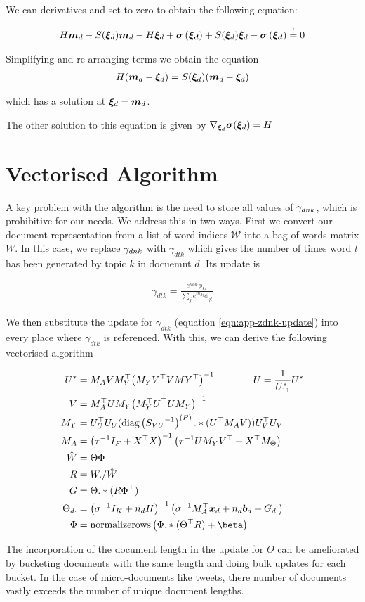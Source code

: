 We can derivatives and set to zero to obtain the following equation:

\begin{align}
  H\bm m_d
- S({ \bm \xi_d })\bm m_d
- H { \bm \xi_d } 
+ \bm \sigma\left(\bm {{ \bm \xi_d }}\right)
+ S({ \bm \xi_d }){ \bm \xi_d } 
- \bm \sigma\left(\bm {{ \bm \xi_d }}\right) 
\overset{!}{=} 0
\end{align}

Simplifying and re-arranging terms we obtain the equation
\begin{align}
H (\bm m_d -  { \bm \xi_d }) = S({ \bm \xi_d })(\bm m_d - { \bm \xi_d })
\end{align}

which has a solution at ${ \bm \xi_d } = \bm m_d$.

The other solution to this equation is given by $\nabla_{ \bm \xi_d } \bm \sigma({ \bm \xi_d }) = H$

\section{Vectorised Algorithm}

A key problem with the algorithm is the need to store all values of ${ \gamma_{dnk} }$, which is prohibitive for our needs. We address this in two ways. First we convert our document representation from a list of word indices $\mathcal{W}$ into a bag-of-words matrix $W$. In this case, we replace ${ \gamma_{dnk} }$ with $\gamma_{dtk}$ which gives the number of times word $t$ has been generated by topic $k$ in docuemnt $d$. Its update is

\begin{align}
\gamma_{dtk} = \frac{e^{m_{dk}} \phi_{kt}}{\sum_j e^{m_{dj}} \phi_{jt}}
\end{align}

We then substitute the update for $\gamma_{dtk}$ (equation \eqref{eqn:app-zdnk-update}) into every place where $\gamma_{dtk}$ is referenced. With this, we can derive the following vectorised algorithm

\begin{align*}
U^* &= M_A V M_Y\T \invb{M_Y V\T V MY\T}  \qquad\qquad U = \frac{1}{U^*_{11}} U^* \\
V & = M_A\T U M_Y \invb{M_Y\T U\T U M_Y} \\
M_Y & = U_U^\top U_U (\diag{\inv{S_{VU}}}^{(P)} .* (U\T M_A V)) U_V^\top U_V \\
M_A & = \invb{\inv\tau I_F + X\T X}\left(\inv\tau UM_YV\T + X\T M_\Theta \right) \\
\hat{W} & = \Theta \Phi \\
R & = W ./ \hat{W} \\
G & = \Theta .* (R \Phi\T) \\
\Theta_{d\cdot} & = \invb{\inv\sigma I_K + n_d H}\left(\inv\sigma M_A\T\xd + n_d \vv{b}_d + G_{d\cdot} \right) \\
\Phi & = \text{normalizerows}\left( \Phi .* (\Theta\T R) + \beta  \right)
\end{align*}

The incorporation of the document length in the update for $\Theta$ can be ameliorated by bucketing documents with the same length and doing bulk updates for each bucket. In the case of micro-documents like tweets, there number of documents vastly exceeds the number of unique document lengths.


